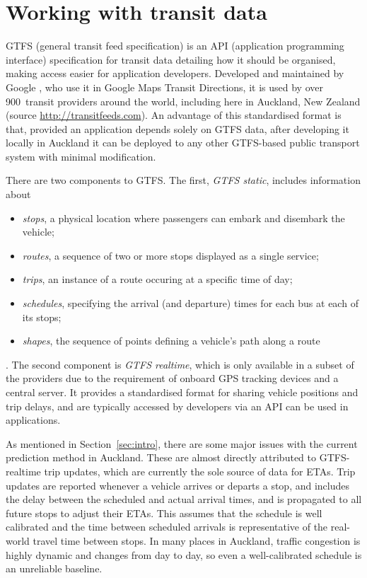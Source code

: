 \section{Working with \rt transit data}
\label{sec:gtfs}

GTFS (general transit feed specification)
is an API (application programming interface) specification for transit data
detailing how it should be organised,
making access easier for application developers.
Developed and maintained by Google \citep{GoogleDevelopers_2006},
who use it in Google Maps Transit Directions,
it is used by over 900~transit providers around the world,
including here in Auckland, New Zealand
(source \url{http://transitfeeds.com}).
An advantage of this standardised format is that,
provided an application depends solely on GTFS data,
after developing it locally in Auckland it can be deployed to any other GTFS-based
public transport system with minimal modification.


There are two components to GTFS.
The first, \emph{GTFS static}, includes information about
\begin{itemize}
\item \emph{stops}, a physical location where passengers can embark and disembark the vehicle;
\item \emph{routes}, a sequence of two or more stops displayed as a single service;
\item \emph{trips}, an instance of a route occuring at a specific time of day;
\item \emph{schedules}, specifying the arrival (and departure) times for each bus at each of its stops; 
\item \emph{shapes}, the sequence of points defining a vehicle's path along a route
\end{itemize}
\citep{GoogleDevelopers_2006}.
The second component is \emph{GTFS realtime},
which is only available in a subset of the providers due to the requirement of 
onboard GPS tracking devices and a central server.
It provides a standardised format for sharing vehicle positions and trip delays,
and are typically accessed by developers via an API can be used in \rt applications.

As mentioned in Section~\ref{sec:intro},
there are some major issues with the current prediction method in Auckland.
These are almost directly attributed to GTFS-realtime trip updates,
which are currently the sole source of data for ETAs.
Trip updates are reported whenever a vehicle arrives or departs a stop,
and includes the delay between the scheduled and actual arrival times,
and is propagated to all future stops to adjust their ETAs.
This assumes that the schedule is well calibrated and the time between scheduled arrivals
is representative of the real-world travel time between stops. 
In many places in Auckland, 
traffic congestion is highly dynamic and changes from day to day,
so even a well-calibrated schedule is an unreliable baseline.


